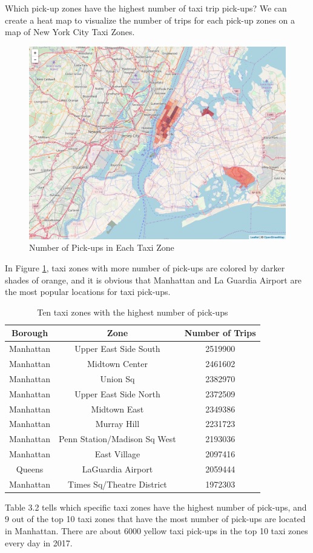 \documentclass[12pt,twoside]{reedthesis}
\theoremstyle{definition}
\theoremstyle{definition}
\theoremstyle{definition}
\theoremstyle{remark}
\begin{document}
Which pick-up zones have the highest number of taxi trip pick-ups? We
can create a heat map to visualize the number of trips for each pick-up
zones on a map of New York City Taxi Zones.
\begin{figure}[h]

{\centering \includegraphics[width=5.84in]{figure/num_trip} 

}

\caption{Number of Pick-ups in Each Taxi Zone}\label{fig:num-trip}
\end{figure}
In Figure \ref{fig:num-trip}, taxi zones with more number of pick-ups
are colored by darker shades of orange, and it is obvious that Manhattan
and La Guardia Airport are the most popular locations for taxi pick-ups.
\begin{table}

\caption{\label{tab:unnamed-chunk-42}Ten taxi zones with the highest number of pick-ups}
\centering
\begin{tabular}[t]{ccc}
\toprule
Borough & Zone & Number of Trips\\
\midrule
Manhattan & Upper East Side South & 2519900\\
Manhattan & Midtown Center & 2461602\\
Manhattan & Union Sq & 2382970\\
Manhattan & Upper East Side North & 2372509\\
Manhattan & Midtown East & 2349386\\
\addlinespace
Manhattan & Murray Hill & 2231723\\
Manhattan & Penn Station/Madison Sq West & 2193036\\
Manhattan & East Village & 2097416\\
Queens & LaGuardia Airport & 2059444\\
Manhattan & Times Sq/Theatre District & 1972303\\
\bottomrule
\end{tabular}
\end{table}
Table 3.2 tells which specific taxi zones have the highest number of
pick-ups, and 9 out of the top 10 taxi zones that have the most number
of pick-ups are located in Manhattan. There are about 6000 yellow taxi
pick-ups in the top 10 taxi zones every day in 2017.
\end{document}
